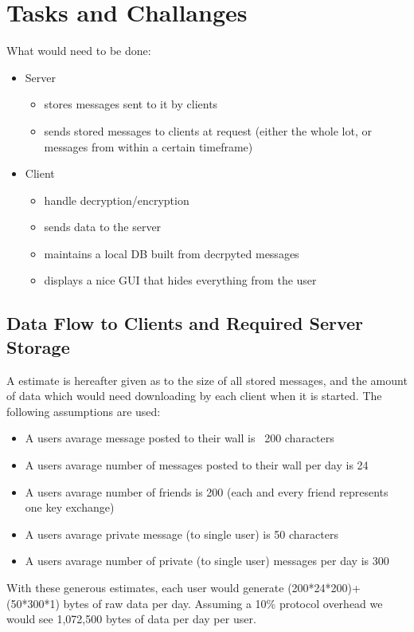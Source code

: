 \section{Tasks and Challanges}
What would need to be done:
\begin{itemize}
\item  Server
    \begin{itemize}
    \item stores messages sent to it by clients
    \item sends stored messages to clients at request (either the whole lot, or
    messages from within a certain timeframe)
    \end{itemize}
\item Client
    \begin{itemize}
    \item handle decryption/encryption
    \item sends data to the server
    \item maintains a local DB built from decrpyted messages
    \item displays a nice GUI that hides everything from the user
    \end{itemize}
\end{itemize}

\subsection{Data Flow to Clients and Required Server Storage}
A estimate is hereafter given as to the size of all stored messages, and the
amount of data which would need downloading by each client when it is started.
The following assumptions are used:
\begin{itemize}
\item A users avarage message posted to their wall is ~200 characters
\item A users avarage number of messages posted to their wall per day is 24
\item A users avarage number of friends is 200 (each and every friend represents
one key exchange)
\item A users avarage private message (to single user) is 50 characters
\item A users avarage number of private (to single user) messages per day is 300
\end{itemize}
With these generous estimates, each user would generate (200*24*200)+(50*300*1)
bytes of raw data per day. Assuming a 10\% protocol overhead we would see
1,072,500 bytes of data per day per user.\\

